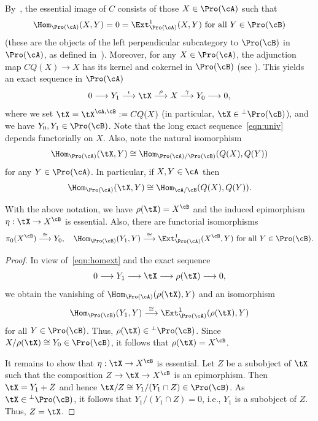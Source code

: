By~\cite[III.2.Cor.]{Gabriel}, the essential image of $C$ consists of those $X \in \Pro(\cA)$ such that
\begin{equation}\label{eqn:homext}
\Hom_{\Pro(\cA)}(X,Y) = 0 = \Ext^1_{\Pro(\cA)}(X,Y)
\text{ for all } Y \in \Pro(\cB)
\end{equation}
(these are the objects of the left perpendicular subcategory to $\Pro(\cB)$ in $\Pro(\cA)$, as defined in~\cite{GL}). Moreover, for any $X \in \Pro(\cA)$, the adjunction map $CQ(X) \to X$ has its kernel and cokernel in $\Pro(\cB)$ (see \cite[III.2.Prop.~3]{GL}). This yields an exact sequence in $\Pro(\cA)$
\begin{equation}\label{eqn:univ}
0 \longrightarrow Y_1
\stackrel{\iota}{\longrightarrow} \tX
\stackrel{\rho}{\longrightarrow} X
\stackrel{\gamma}{\longrightarrow} Y_0
\longrightarrow 0,
\end{equation}
where we set $\tX = \tX^{\cA,\cB} := CQ(X)$ (in particular, $\tX \in {^{\perp}\Pro(\cB)}$), and we have $Y_0,Y_1 \in \Pro(\cB)$. Note that the long exact sequence~\eqref{eqn:univ} depends functorially on $X$. Also, note the natural isomorphism
\[
\Hom_{\Pro(\cA)}(\tX,Y) \cong
\Hom_{\Pro(\cA)/\Pro(\cB)}(Q(X),Q(Y))
\]
for any $Y \in \Pro(\cA)$. In particular, if $X,Y \in \cA$ then
\begin{equation}\label{eqn:adj}
\Hom_{\Pro(\cA)}(\tX,Y) \cong \Hom_{\cA/\cB}(Q(X),Q(Y)).
\end{equation}

\begin{lemm}\label{lem:isos}
With the above notation, we have $\rho(\tX) = X^{\cB}$ and the induced epimorphism $\eta: \tX \to X^{\cB}$ is essential. Also, there are functorial isomorphisms
\[
\pi_0(X^{\cB}) \stackrel{\cong}{\longrightarrow} Y_0, \quad
\Hom_{\Pro(\cB)}(Y_1,Y) \stackrel{\cong}{\longrightarrow}
\Ext^1_{\Pro(\cA)}(X^{\cB}, Y) \text{ for all } Y \in \Pro(\cB).
\]
\end{lemm}

\begin{proof}
In view of~\eqref{eqn:homext} and the exact sequence
\[
0 \longrightarrow Y_1 \longrightarrow \tX \longrightarrow
\rho(\tX) \longrightarrow 0,
\]
we obtain the vanishing of $\Hom_{\Pro(\cA)}(\rho(\tX),Y)$ and an isomorphism
\[
\Hom_{\Pro(\cB)}(Y_1,Y) \stackrel{\cong}{\longrightarrow}
\Ext^1_{\Pro(\cA)}(\rho(\tX), Y)
\]
for all $Y \in \Pro(\cB)$. Thus, $\rho(\tX) \in {^{\perp}\Pro(\cB)}$. Since $X/\rho(\tX) \cong Y_0 \in \Pro(\cB)$, it follows that $\rho(\tX) = X^{\cB}$.

It remains to show that $\eta : \tX \to X^{\cB}$ is essential. Let $Z$ be a subobject of $\tX$ such that the composition $Z \to \tX \to X^{\cB}$ is an epimorphism. Then $\tX = Y_1 + Z$ and hence $\tX/Z \cong Y_1/(Y_1 \cap Z) \in \Pro(\cB)$. As $\tX \in {^{\perp}\Pro(\cB)}$, it follows that $Y_1/(Y_1 \cap Z) = 0$, i.e., $Y_1$ is a subobject of $Z$. Thus, $Z = \tX$.
\end{proof}

